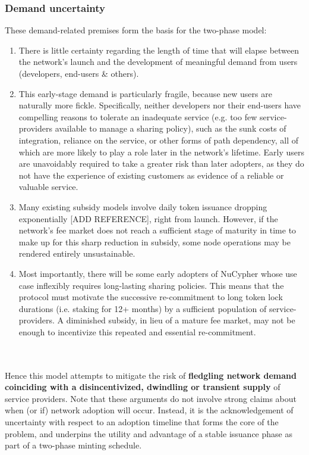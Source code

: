 \documentclass[longbibliography,nofootinbib]{revtex4-1}
\begin{document}
\subsubsection{Demand uncertainty}\label{demand}

These demand-related premises form the basis for the two-phase model: 
\begin{enumerate}
\item There is little certainty regarding the length of time that will elapse between the network's launch and the development of meaningful demand from users (developers, end-users \& others).
\item This early-stage demand is particularly fragile, because new users are naturally more fickle. Specifically, neither developers nor their end-users have compelling reasons to tolerate an inadequate service (e.g. too few service-providers available to manage a sharing policy), such as the sunk costs of integration, reliance on the service, or other forms of path dependency, all of which are more likely to play a role later in the network's lifetime. Early users are unavoidably required to take a greater risk than later adopters, as they do not have the experience of existing customers as evidence of a reliable or valuable service.
\item Many existing subsidy models involve daily token issuance dropping exponentially [ADD REFERENCE], right from launch. However, if the network's fee market does not reach a sufficient stage of maturity in time to make up for this sharp reduction in subsidy, some node operations may be rendered entirely unsustainable. 
\item Most importantly, there will be some early adopters of NuCypher whose use case inflexibly requires long-lasting sharing policies. This means that the protocol must motivate the successive re-commitment to long token lock durations (i.e. staking for 12+ months) by a sufficient population of service-providers. A diminished subsidy, in lieu of a mature fee market, may not be enough to incentivize this repeated and essential re-commitment. 
\end{enumerate}

\\\\
Hence this model attempts to mitigate the risk of \textbf{fledgling network demand coinciding with a disincentivized, dwindling or transient supply} of service providers. Note that these arguments do not involve strong claims about when (or if) network adoption will occur. Instead, it is the acknowledgement of uncertainty with respect to an adoption timeline that forms the core of the problem, and underpins the utility and advantage of a stable issuance phase as part of a two-phase minting schedule. 
\end{document}
